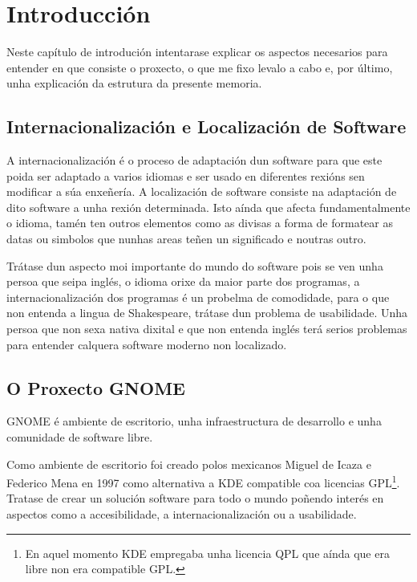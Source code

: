 %
%

\chapter[Introducción]{Introducción}

Neste capítulo de introdución intentarase explicar os aspectos necesarios para entender en que consiste o proxecto, o que me fixo levalo a cabo e, por último, unha explicación da estrutura da presente memoria. 

\section{Internacionalización e Localización de Software}
A internacionalización é o proceso de adaptación dun software para que este poida ser adaptado a varios idiomas e ser usado en diferentes rexións sen modificar a súa enxeñería. A localización de software consiste na adaptación de dito software a unha rexión determinada. Isto aínda que afecta fundamentalmente o idioma, tamén ten outros elementos como as divisas a forma de formatear as datas ou simbolos que nunhas areas teñen un significado e noutras outro.

Trátase dun aspecto moi importante do mundo do software pois se ven unha persoa que seipa inglés, o idioma orixe da maior parte dos programas, a internacionalización dos programas é un probelma de comodidade, para o que non entenda a lingua de Shakespeare, trátase dun problema de usabilidade. Unha persoa que non sexa nativa dixital e que non entenda inglés terá serios problemas para entender calquera software moderno non localizado.

\section{O Proxecto GNOME}
GNOME é ambiente de escritorio, unha infraestructura de desarrollo e unha comunidade de software libre.

Como ambiente de escritorio foi creado polos mexicanos Miguel de Icaza e Federico Mena en 1997 como alternativa a KDE compatible coa licencias GPL\footnote{En aquel momento KDE empregaba unha licencia QPL que aínda que era libre non era compatible GPL.}. Tratase de crear un solución software para todo o mundo poñendo interés en aspectos como a accesibilidade, a internacionalización ou a usabilidade.

